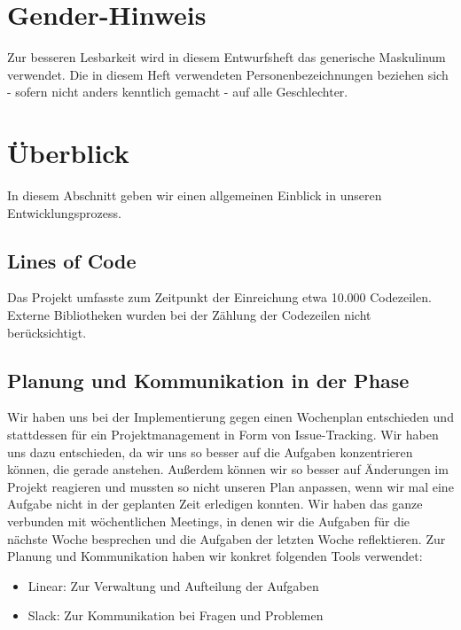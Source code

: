 \documentclass{implementierungsheft}
\begin{document}

\maketitle
\tableofcontents
\newpage

\section*{Gender-Hinweis}
Zur besseren Lesbarkeit wird in diesem Entwurfsheft das generische Maskulinum verwendet.
Die in diesem Heft verwendeten Personenbezeichnungen beziehen sich - sofern nicht anders kenntlich gemacht - auf alle Geschlechter.
\newpage

\section{Überblick}
In diesem Abschnitt geben wir einen allgemeinen Einblick in unseren Entwicklungsprozess.

\subsection{Lines of Code}
Das Projekt umfasste zum Zeitpunkt der Einreichung etwa 10.000 Codezeilen. Externe Bibliotheken wurden bei der Zählung der Codezeilen nicht berücksichtigt. 
\subsection{Planung und Kommunikation in der Phase}
Wir haben uns bei der Implementierung gegen einen Wochenplan entschieden und stattdessen für ein Projektmanagement in Form von Issue-Tracking.
Wir haben uns dazu entschieden, da wir uns so besser auf die Aufgaben konzentrieren können, die gerade anstehen.
Außerdem können wir so besser auf Änderungen im Projekt reagieren und mussten so nicht unseren Plan anpassen, wenn wir mal eine Aufgabe nicht in der geplanten Zeit erledigen konnten.
Wir haben das ganze verbunden mit wöchentlichen Meetings, in denen wir die Aufgaben für die nächste Woche besprechen und die Aufgaben der letzten Woche reflektieren.
Zur Planung und Kommunikation haben wir konkret folgenden Tools verwendet:
\begin{itemize}
    \item Linear: Zur Verwaltung und Aufteilung der Aufgaben
    \item Slack: Zur Kommunikation bei Fragen und Problemen
\end{itemize}
\end{document}
